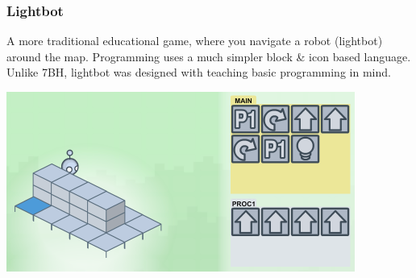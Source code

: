 \documentclass{beamer}
\begin{document}
\begin{frame}
  \frametitle{Lightbot}
  A more traditional educational game, where you navigate a robot (lightbot) around the map. Programming uses a much simpler block \& icon based language. Unlike 7BH, lightbot was designed with teaching basic programming in mind.
\end{frame}
\begin{frame}
  \begin{center}
    \includegraphics[width=\textwidth,height=\textheight,keepaspectratio]{lbot.png}
  \end{center}
\end{frame}
\end{document}
